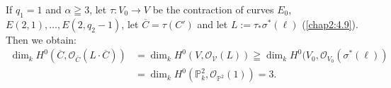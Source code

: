 \begin{remark*}
If $q_{1}=1$ and $\alpha\geqq 3$, let $\tau:V_{0}\to V$ be the
contraction of curves $E_{0}$, $E(2,1),\ldots,E(2,q_{2}-1)$, let
$\overline{C}=\tau(C')$ and let $L:=\tau_{\ast}\sigma^{\ast}(\ell)$
(\cf \ref{chap2:4.9}). Then we obtain:
\begin{align*}
\dim_{k}H^{0}(\overline{C},\mathscr{O}_{\overline{C}}(L\cdot
\overline{C})) &= \dim_{k}H^{0}(V,\mathscr{O_{V}}(L))\geqq
\dim_{k}H^{0}(V_{0},\mathscr{O}_{V_{0}}(\sigma^{\ast}(\ell))\\ 
 &= \dim_{k}H^{0}(\mathbb{P}^{2}_{k},\mathscr{O}_{\mathbb{P}^{2}}(1))=3.
\end{align*}\pageoriginale\
\end{remark*}

\subsection{}\label{chap2:4.11}
